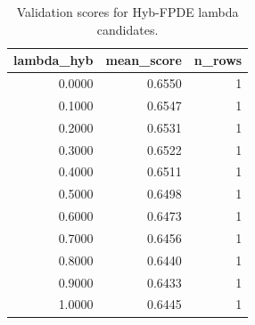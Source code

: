\begin{table}[t]
\caption{Validation scores for Hyb-FPDE lambda candidates.}
\label{tab:lambda_distribution_computed}
\centering
\begin{tabular}{rrr}
\toprule
lambda\_hyb & mean\_score & n\_rows \\
\midrule
0.0000 & 0.6550 & 1 \\
0.1000 & 0.6547 & 1 \\
0.2000 & 0.6531 & 1 \\
0.3000 & 0.6522 & 1 \\
0.4000 & 0.6511 & 1 \\
0.5000 & 0.6498 & 1 \\
0.6000 & 0.6473 & 1 \\
0.7000 & 0.6456 & 1 \\
0.8000 & 0.6440 & 1 \\
0.9000 & 0.6433 & 1 \\
1.0000 & 0.6445 & 1 \\
\bottomrule
\end{tabular}

\end{table}
